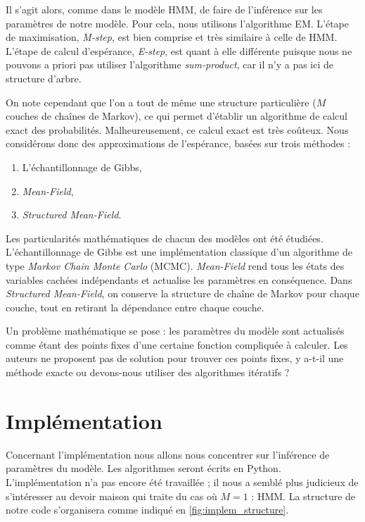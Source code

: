 \documentclass[10pt,a4paper]{article}
\newcommand{\hmm}{\textsc{HMM}}
\newcommand{\mcmc}{\textsc{MCMC}}
\begin{document}
Il s'agit alors, comme dans le modèle \hmm{}, de faire de l'inférence sur
les paramètres de notre modèle.
Pour cela, nous utilisons l'algorithme EM.
L'étape de maximisation, \emph{M-step}, est bien comprise et très
similaire à celle de \hmm{}.
L'étape de calcul d'espérance, \emph{E-step}, est quant à elle différente
puisque nous ne pouvons a priori pas utiliser l'algorithme \emph{sum-product},
car il n'y a pas ici de structure d'arbre.

On note cependant que l'on a tout de même une structure particulière ($M$
couches de chaînes de Markov), ce qui permet d'établir un algorithme de calcul
exact des probabilités.
Malheureusement, ce calcul exact est très coûteux.
Nous considérons donc des approximations de l'espérance, basées sur trois
méthodes :

\begin{enumerate}
  \item L'échantillonnage de Gibbs,
  \item \emph{Mean-Field},
  \item \emph{Structured Mean-Field}.
\end{enumerate}

Les particularités mathématiques de chacun des modèles ont été étudiées.
L'échantillonnage de Gibbs est une implémentation classique d'un algorithme de
type \emph{Markov Chain Monte Carlo} (\mcmc).
\emph{Mean-Field} rend tous les états des variables cachées indépendants et
actualise les paramètres en conséquence.
Dans \emph{Structured Mean-Field}, on conserve la structure de chaîne de
Markov pour chaque couche, tout en retirant la dépendance entre chaque couche.

Un problème mathématique se pose : les paramètres du modèle sont actualisés
comme étant des points fixes d'une certaine fonction compliquée à calculer.
Les auteurs ne proposent pas de solution pour trouver ces points fixes, y
a-t-il une méthode exacte ou devons-nous utiliser des algorithmes itératifs ?

\section{Implémentation}

Concernant l'implémentation nous allons nous concentrer sur l'inférence de
paramètres du modèle.
Les algorithmes seront écrits en Python. L'implémentation n'a pas encore été
travaillée ; il nous a semblé plus judicieux de s'intéresser au devoir maison
qui traite du cas où $M=1$ : \hmm. La structure de notre code
s'organisera comme indiqué en \autoref{fig:implem_structure}.
\end{document}
